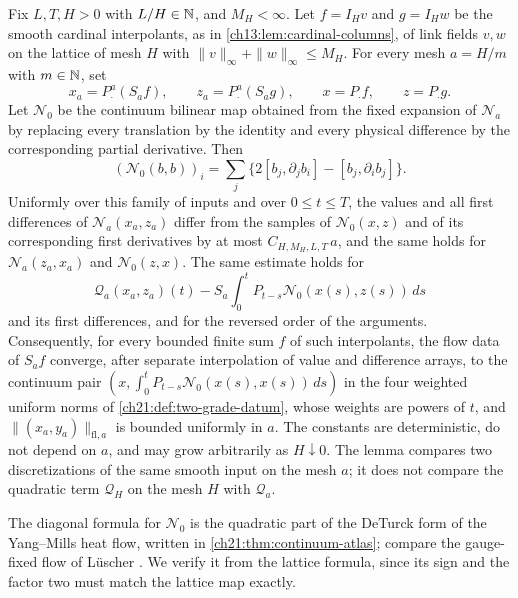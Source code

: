 \begin{lemma}\label{ch22:lem:fixed-prefix-coefficients}
Fix $L,T,H>0$ with $L/H\in\mathbb N$, and $M_H<\infty$. Let $f=I_Hv$ and $g=I_Hw$ be the smooth cardinal interpolants, as in \cref{ch13:lem:cardinal-columns}, of link fields $v,w$ on the lattice of mesh $H$ with $\|v\|_\infty+\|w\|_\infty\le M_H$. For every mesh $a=H/m$ with $m\in\mathbb N$, set
\[
 x_a=P_\cdot^a(S_af),\qquad z_a=P_\cdot^a(S_ag),\qquad x=P_\cdot f,\qquad z=P_\cdot g .
\]
Let $\mathcal N_0$ be the continuum bilinear map obtained from the fixed expansion of $\mathcal N_a$ by replacing every translation by the identity and every physical difference by the corresponding partial derivative. Then
\[
 (\mathcal N_0(b,b))_i=\sum_j\bigl\{2[b_j,\partial_jb_i]-[b_j,\partial_ib_j]\bigr\}.
\]
Uniformly over this family of inputs and over $0\le t\le T$, the values and all first differences of $\mathcal N_a(x_a,z_a)$ differ from the samples of $\mathcal N_0(x,z)$ and of its corresponding first derivatives by at most $C_{H,M_H,L,T}\,a$, and the same holds for $\mathcal N_a(z_a,x_a)$ and $\mathcal N_0(z,x)$. The same estimate holds for
\[
 \mathcal Q_a(x_a,z_a)(t)-S_a\int_0^tP_{t-s}\mathcal N_0(x(s),z(s))\,ds
\]
and its first differences, and for the reversed order of the arguments. Consequently, for every bounded finite sum $f$ of such interpolants, the flow data of $S_af$ converge, after separate interpolation of value and difference arrays, to the continuum pair $(x,\int_0^tP_{t-s}\mathcal N_0(x(s),x(s))\,ds)$ in the four weighted uniform norms of \cref{ch21:def:two-grade-datum}, whose weights are powers of $t$, and $\|(x_a,y_a)\|_{\mathrm{fl},a}$ is bounded uniformly in $a$. The constants are deterministic, do not depend on $a$, and may grow arbitrarily as $H\downarrow0$. The lemma compares two discretizations of the same smooth input on the mesh $a$; it does not compare the quadratic term $\mathcal Q_H$ on the mesh $H$ with $\mathcal Q_a$.
\end{lemma}

The diagonal formula for $\mathcal N_0$ is the quadratic part of the DeTurck form of the Yang--Mills heat flow, written in \cref{ch21:thm:continuum-atlas}; compare the gauge-fixed flow of L\"uscher \cite[Section~2.2]{Luscher2010WilsonFlow}. We verify it from the lattice formula, since its sign and the factor two must match the lattice map exactly.

